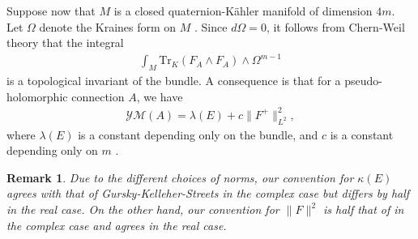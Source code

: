 \documentclass[12pt]{amsart}
\renewcommand{\1}{{\mathbf 1}}
\newcommand{\R}{{\mathbb R}}
\theoremstyle{others}
\newtheorem{rmk}[thm]{Remark}
\numberwithin{equation}{section}
\begin{document}
Suppose now that \(M\) is a closed quaternion-K{\"a}hler manifold of dimension \(4m\). Let \(\Omega\) denote the Kraines form on \(M\) \cite{kraines}. Since \(d\Omega = 0\), it follows from Chern-Weil theory that the integral
\begin{align*}
    \int_M \text{Tr}_K(F_A \wedge F_A) \wedge \Omega^{m-1}
\end{align*} is a topological invariant of the bundle. A consequence is that for a pseudo-holomorphic connection \(A\), we have 
\begin{align}\label{preliminaries:qkchernweil}
    \mathcal{YM}(A) = \lambda(E) + c\|F^+\|_{L^2}^2,
\end{align} where \(\lambda(E)\) is a constant depending only on the bundle, and \(c\) is a constant depending only on \(m\) \cite[Lemma 2.3 (ii)]{oliveirawaldron}.
\begin{rmk}\label{rmk:gkscomparison}
Due to the different choices of norms, our convention for $\kappa(E)$ agrees with that of Gursky-Kelleher-Streets \cite{gurskykelleherstreets} in the complex case but differs by half in the real case. On the other hand, our convention for $\|F\|^2$ is half that of \cite{gurskykelleherstreets} in the complex case and agrees in the real case.
\end{rmk}




\vspace{5mm}

\end{document}
